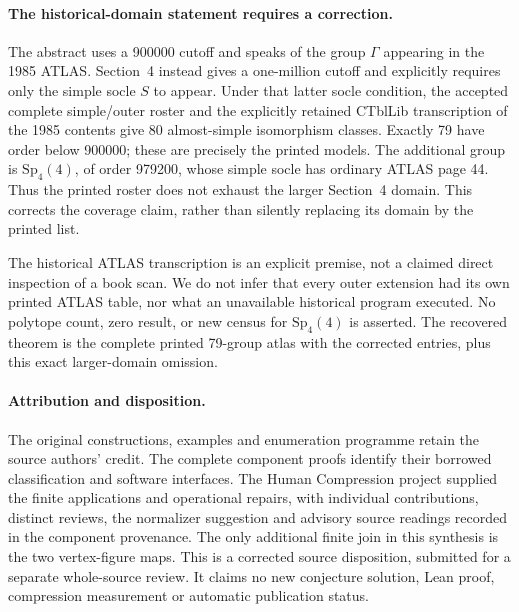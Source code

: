 \documentclass[11pt,a4paper]{article}
\begin{document}
\paragraph{The historical-domain statement requires a correction.}
The abstract uses a 900000 cutoff and speaks of the group $\Gamma$ appearing
in the 1985 ATLAS. Section~4 instead gives a one-million cutoff and explicitly
requires only the simple socle $S$ to appear. Under that latter socle condition,
the accepted complete simple/outer roster and the explicitly retained CTblLib
transcription of the 1985 contents give 80 almost-simple isomorphism classes.
Exactly 79 have order below 900000; these are precisely the printed models.
The additional group is $\mathrm{Sp}_4(4)$, of order 979200, whose simple
socle has ordinary ATLAS page 44. Thus the printed roster does not exhaust
the larger Section~4 domain. This corrects the coverage claim, rather than
silently replacing its domain by the printed list.

The historical ATLAS transcription is an explicit premise, not a claimed
direct inspection of a book scan. We do not infer that every outer extension
had its own printed ATLAS table, nor what an unavailable historical program
executed. No polytope count, zero result, or new census for $\mathrm{Sp}_4(4)$
is asserted. The recovered theorem is the complete printed 79-group atlas
with the corrected entries, plus this exact larger-domain omission.

\paragraph{Attribution and disposition.}
The original constructions, examples and enumeration programme retain the
source authors' credit. The complete component proofs identify their borrowed
classification and software interfaces. The Human Compression project supplied
the finite applications and operational repairs, with individual contributions,
distinct reviews, the normalizer suggestion and advisory source readings
recorded in the component provenance. The only additional finite join in this synthesis is the two
vertex-figure maps. This is a corrected source disposition, submitted for a
separate whole-source review. It claims no new conjecture solution, Lean proof,
compression measurement or automatic publication status.
\end{document}
